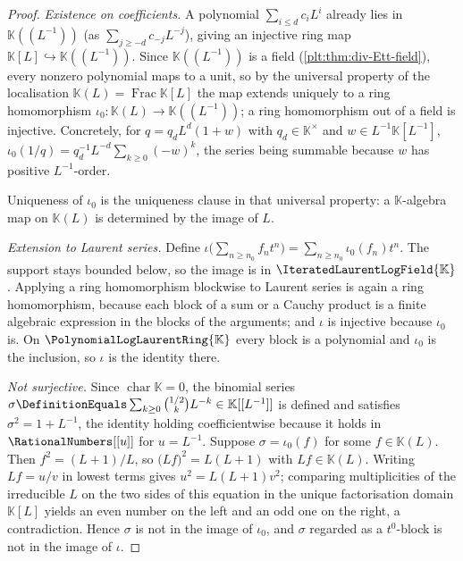 \documentclass[11pt,oneside]{article}
\theoremstyle{plain}
\theoremstyle{definition}
\theoremstyle{remark}
\newcommand{\K}{\mathbb{K}}
\newcommand{\PLlau}{\PolynomialLogLaurentRing{\K}}       %
\newcommand{\PLit}{\IteratedLaurentLogField{\K}}         %
\begin{document}
\begin{proof}
\emph{Existence on coefficients.}  A polynomial \(\sum_{i\le d}c_{i}L^{i}\)
already lies in \(\K((L^{-1}))\) (as \(\sum_{j\ge-d}c_{-j}L^{-j}\)), giving an
injective ring map \(\K[L]\hookrightarrow\K((L^{-1}))\).  Since
\(\K((L^{-1}))\) is a field (\cref{plt:thm:div-Ett-field}), every nonzero
polynomial maps to a unit, so by the universal property of the localisation
\(\K(L)=\operatorname{Frac}\K[L]\) the map extends uniquely to a ring
homomorphism \(\iota_{0}:\K(L)\to\K((L^{-1}))\); a ring homomorphism out of a
field is injective.  Concretely, for \(q=q_{d}L^{d}(1+w)\) with
\(q_{d}\in\K^{\times}\) and \(w\in L^{-1}\K[L^{-1}]\),
\(\iota_{0}(1/q)=q_{d}^{-1}L^{-d}\sum_{k\ge0}(-w)^{k}\), the series being
summable because \(w\) has positive \(L^{-1}\)-order.

Uniqueness of \(\iota_{0}\) is the uniqueness clause in that universal
property: a \(\K\)-algebra map on \(\K(L)\) is determined by the image of
\(L\).

\emph{Extension to Laurent series.}  Define
\(\iota\bigl(\sum_{n\ge n_{0}}f_{n}t^{n}\bigr)
=\sum_{n\ge n_{0}}\iota_{0}(f_{n})t^{n}\).  The support stays bounded below, so
the image is in \(\PLit\).  Applying a ring homomorphism blockwise to Laurent
series is again a ring homomorphism, because each block of a sum or a Cauchy
product is a finite algebraic expression in the blocks of the arguments; and
\(\iota\) is injective because \(\iota_{0}\) is.  On \(\PLlau\) every block is
a polynomial and \(\iota_{0}\) is the inclusion, so \(\iota\) is the identity
there.

\emph{Not surjective.}  Since \(\operatorname{char}\K=0\), the binomial series
\(\sigma\DefinitionEquals\sum_{k\ge0}\binom{1/2}{k}L^{-k}\in\K[[L^{-1}]]\) is
defined and satisfies \(\sigma^{2}=1+L^{-1}\), the identity holding
coefficientwise because it holds in \(\RationalNumbers[[u]]\) for
\(u=L^{-1}\).  Suppose \(\sigma=\iota_{0}(f)\) for some \(f\in\K(L)\).  Then
\(f^{2}=(L+1)/L\), so \(\bigl(Lf\bigr)^{2}=L(L+1)\) with \(Lf\in\K(L)\).
Writing \(Lf=u/v\) in lowest terms gives \(u^{2}=L(L+1)v^{2}\); comparing
multiplicities of the irreducible \(L\) on the two sides of this equation in
the unique factorisation domain \(\K[L]\) yields an even number on the left and
an odd one on the right, a contradiction.  Hence \(\sigma\) is not in the image
of \(\iota_{0}\), and \(\sigma\) regarded as a \(t^{0}\)-block is not in the
image of \(\iota\).
\end{proof}
\end{document}

